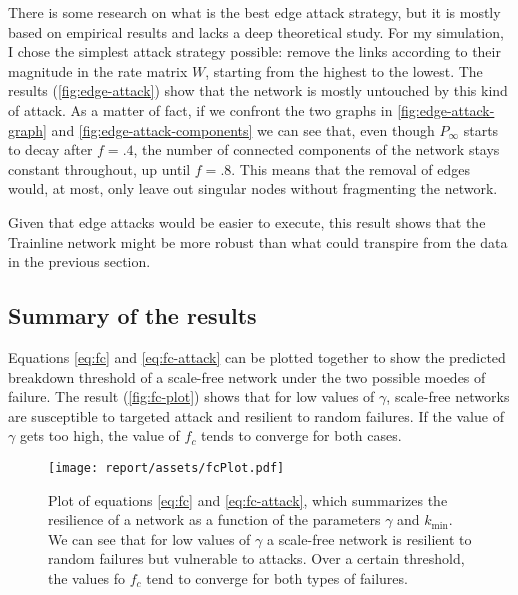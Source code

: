 There is some research \cite{edgeremoval} on what is the best edge attack strategy, but it is mostly based on empirical results and lacks a deep theoretical study.
For my simulation, I chose the simplest attack strategy possible: remove the links according to their magnitude in the rate matrix $W$, starting from the highest to the lowest. The results (\autoref{fig:edge-attack}) show that the network is mostly untouched by this kind of attack. As a matter of fact, if we confront the two graphs in \autoref{fig:edge-attack-graph} and \autoref{fig:edge-attack-components} we can see that, even though $P_\infty$ starts to decay after $f=.4$, the number of connected components of the network stays constant throughout, up until $f=.8$.
This means that the removal of edges would, at most, only leave out singular nodes without fragmenting the network.

Given that edge attacks would be easier to execute, this result shows that the Trainline network might be more robust than what could transpire from the data in the previous section.





\subsection{Summary of the results}
Equations \eqref{eq:fc} and \eqref{eq:fc-attack} can be plotted together to show the predicted breakdown threshold of a scale-free network under the two possible moedes of failure. The result (\autoref{fig:fc-plot}) shows that for low values of $\gamma$, scale-free networks are susceptible to targeted attack and resilient to random failures. If the value of $\gamma$ gets too high, the value of $f_c$ tends to converge for both cases.

\begin{figure}[h]
    \centering
    \texttt{[image: report/assets/fcPlot.pdf]}
    \caption{Plot of equations \eqref{eq:fc} and \eqref{eq:fc-attack}, which summarizes the resilience of a network as a function of the parameters $\gamma$ and $k_{\min}$. We can see that for low values of $\gamma$ a scale-free network is resilient to random failures but vulnerable to attacks. Over a certain threshold, the values fo $f_c$ tend to converge for both types of failures.}
    \label{fig:fc-plot}
\end{figure}